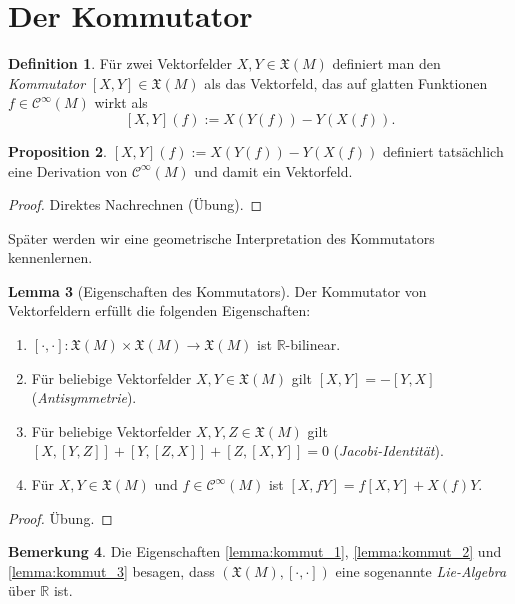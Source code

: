 \documentclass[a4paper]{scrreprt}
\numberwithin{equation}{chapter}
\newcommand{\R}{\mathbb{R}}
\newcommand{\sC}{\mathcal{C}^{\infty}}
\theoremstyle{definition}
\newtheorem{defn}{Definition}[section]
\newtheorem{lemma}[defn]{Lemma}
\newtheorem{prop}[defn]{Proposition}
\newtheorem{bem}[defn]{Bemerkung}
\newcommand{\bewUeb}{\begin{proof}Übung.\end{proof}}
\begin{document}
\section{Der Kommutator}

\begin{defn}
	Für zwei Vektorfelder $X, Y \in \mathfrak X(M)$ definiert man den \emph{Kommutator} $[X,Y] \in \mathfrak X(M)$ als das Vektorfeld, das auf glatten Funktionen $f\in \sC(M)$ wirkt als
	\[[X,Y](f) := X(Y(f)) - Y(X(f)).\]
\end{defn}

\begin{prop}
	$[X,Y](f) := X(Y(f)) - Y(X(f))$ definiert tatsächlich eine Derivation von $\sC(M)$ und damit ein Vektorfeld.

	\begin{proof}
		Direktes Nachrechnen (Übung).
	\end{proof}
\end{prop}

Später werden wir eine geometrische Interpretation des Kommutators kennenlernen.

\begin{lemma}[Eigenschaften des Kommutators] \label{lemma:kommut}
	Der Kommutator von Vektorfeldern erfüllt die folgenden Eigenschaften:
	\begin{enumerate}[label=(\alph*)]
		\item \label{lemma:kommut_1} $[\cdot,\cdot] \colon \mathfrak X(M) \times \mathfrak X(M) \to \mathfrak X(M)$ ist $\R$-bilinear.
		\item \label{lemma:kommut_2} Für beliebige Vektorfelder $X,Y \in \mathfrak X(M)$ gilt $[X,Y] = -[Y,X]$ (\emph{Antisymmetrie}).
		\item \label{lemma:kommut_3} Für beliebige Vektorfelder $X,Y,Z \in \mathfrak X(M)$ gilt $[X,[Y,Z]] + [Y,[Z,X]] + [Z,[X,Y]] = 0$ (\emph{Jacobi-Identität}).
		\item \label{lemma:kommut_4} Für $X,Y \in \mathfrak X(M)$ und $f \in \sC(M)$ ist $[X,fY] = f[X,Y] + X(f) Y$.
	\end{enumerate}
	\bewUeb
\end{lemma}
\begin{bem}
	Die Eigenschaften \ref{lemma:kommut_1}, \ref{lemma:kommut_2} und \ref{lemma:kommut_3} besagen, dass $(\mathfrak X(M), [\cdot,\cdot])$ eine sogenannte \emph{Lie-Algebra} über $\R$ ist.
\end{bem}
\end{document}
